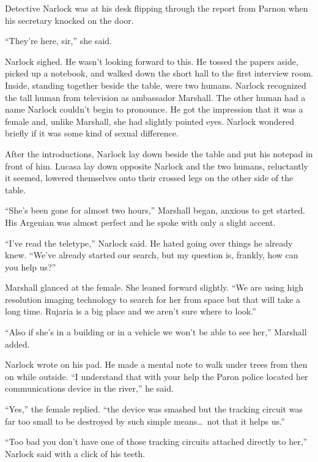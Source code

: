 

Detective Narlock was at his desk flipping through the report from Parnon when his secretary
knocked on the door.

``They're here, sir,'' she said.

Narlock sighed. He wasn't looking forward to this. He tossed the papers aside, picked up a
notebook, and walked down the short hall to the first interview room. Inside, standing together
beside the table, were two humans. Narlock recognized the tall human from television as
ambassador Marshall. The other human had a name Narlock couldn't begin to pronounce. He got the
impression that it was a female and, unlike Marshall, she had slightly pointed eyes. Narlock
wondered briefly if it was some kind of sexual difference.

After the introductions, Narlock lay down beside the table and put his notepad in front of him.
Lucasa lay down opposite Narlock and the two humans, reluctantly it seemed, lowered themselves
onto their crossed legs on the other side of the table.

``She's been gone for almost two hours,'' Marshall began, anxious to get started. His Argenian
was almost perfect and he spoke with only a slight accent.

``I've read the teletype,'' Narlock said. He hated going over things he already knew. ``We've
already started our search, but my question is, frankly, how can you help us?''

Marshall glanced at the female. She leaned forward slightly. ``We are using high resolution
imaging technology to search for her from space but that will take a long time. Rujaria is a big
place and we aren't sure where to look.''

``Also if she's in a building or in a vehicle we won't be able to see her,'' Marshall added.

Narlock wrote on his pad. He made a mental note to walk under trees from then on while outside.
``I understand that with your help the Paron police located her communications device in the
river,'' he said.

``Yes,'' the female replied. ``the device was smashed but the tracking circuit was far too small
to be destroyed by such simple means\ldots\ not that it helps us.''

``Too bad you don't have one of those tracking circuits attached directly to her,'' Narlock said
with a click of his teeth.

